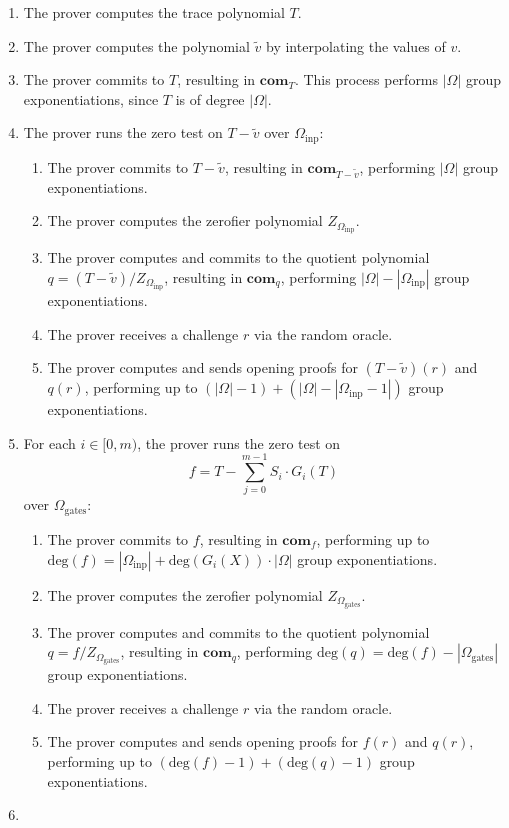 \documentclass[11pt]{article}
\begin{document}
\begin{enumerate}
	\item The prover computes the trace polynomial $T$.
	\item The prover computes the polynomial $\widetilde{v}$ by interpolating the values of $v$.
	\item The prover commits to $T$, resulting in $\mathbf{com}_T$.
		This process performs $|\Omega|$ group exponentiations, since $T$ is of degree $|\Omega|$.
	\item The prover runs the zero test on $T - \widetilde{v}$ over $\Omega_{\text{inp}}$:
		\begin{enumerate}
			\item The prover commits to $T - \widetilde{v}$, resulting in $\mathbf{com}_{T - \widetilde{v}}$,
				performing $|\Omega|$ group exponentiations.
			\item The prover computes the zerofier polynomial $Z_{\Omega_{\text{inp}}}$.
			\item The prover computes and commits to the quotient polynomial
				$q = (T - \widetilde{v}) / Z_{\Omega_{\text{inp}}}$,
				resulting in $\mathbf{com}_q$, performing $|\Omega| - |\Omega_{\text{inp}}|$
				group exponentiations.
			\item The prover receives a challenge $r$ via the random oracle.
			\item The prover computes and sends opening proofs for $(T - \widetilde{v})(r)$ and $q(r)$,
				performing up to $(|\Omega| - 1) + (|\Omega| - |\Omega_{\text{inp}} - 1|)$
				group exponentiations.
		\end{enumerate}
	\item For each $i \in [0,m)$, the prover runs the zero test on
		\begin{equation}
			f = T - \sum_{j=0}^{m-1} S_i \cdot G_i(T)
		\end{equation}
		over $\Omega_{\text{gates}}$:
		\begin{enumerate}
			\item The prover commits to $f$, resulting in $\mathbf{com}_f$,
				performing up to $\text{deg}(f) = |\Omega_{\text{inp}}| + \text{deg}(G_i(X)) \cdot |\Omega|$
				group exponentiations.
			\item The prover computes the zerofier polynomial $Z_{\Omega_{\text{gates}}}$.
			\item The prover computes and commits to the quotient polynomial
				$q = f / Z_{\Omega_{\text{gates}}}$, resulting in $\mathbf{com}_q$,
				performing $\text{deg}(q) = \text{deg}(f) - |\Omega_{\text{gates}}|$ group exponentiations.
			\item The prover receives a challenge $r$ via the random oracle.
			\item The prover computes and sends opening proofs for $f(r)$ and $q(r)$,
				performing up to $(\text{deg}(f) - 1) + (\text{deg}(q) - 1)$ group exponentiations.
		\end{enumerate}
	\item 
\end{enumerate}
\end{document}
